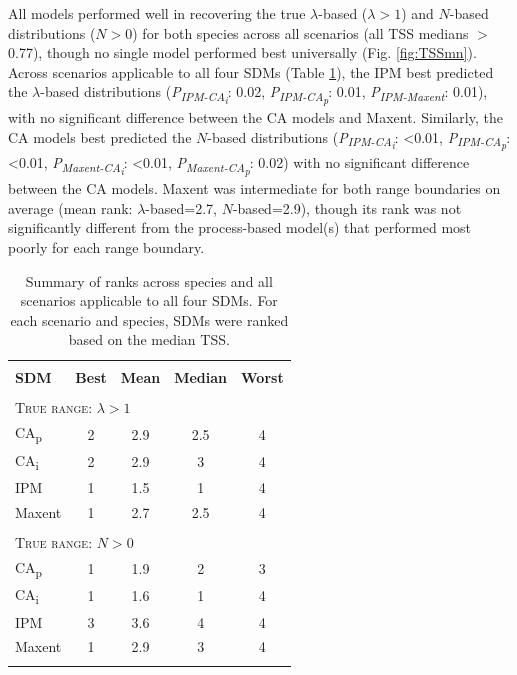 \documentclass[preprint,review,times,12pt]{elsarticle}
\begin{document}
All models performed well in recovering the true $\lambda$-based ($\lambda > 1$) and $N$-based distributions ($N>0$) for both species across all scenarios (all TSS medians $>$ 0.77), though no single model performed best universally (Fig. \ref{fig:TSSmn}). Across scenarios applicable to all four SDMs (Table \ref{table:ranks}), the IPM best predicted the $\lambda$-based distributions (\emph{P\textsubscript{IPM-CA\textsubscript{i}}}: 0.02, \emph{P\textsubscript{IPM-CA\textsubscript{p}}}: 0.01, \emph{P\textsubscript{IPM-Maxent}}: 0.01), with no significant difference between the CA models and Maxent. Similarly, the CA models best predicted the $N$-based distributions (\emph{P\textsubscript{IPM-CA\textsubscript{i}}}: \textless0.01, \emph{P\textsubscript{IPM-CA\textsubscript{p}}}: \textless0.01, \emph{P\textsubscript{Maxent-CA\textsubscript{i}}}: \textless0.01, \emph{P\textsubscript{Maxent-CA\textsubscript{p}}}: 0.02) with no significant difference between the CA models. Maxent was intermediate for both range boundaries on average (mean rank: $\lambda$-based=2.7, $N$-based=2.9), though its rank was not significantly different from the process-based model(s) that performed most poorly for each range boundary.

\begin{table}
	\centering
	\captionsetup{width=.75\textwidth}
	\begin{tabular}{l c c c c}
		\hline \\[-3.5ex]
		\textbf{SDM} & \textbf{Best} & \textbf{Mean} & \textbf{Median} & \textbf{Worst}\\
		\hline 
		\hline \\[-2.5ex]
		\multicolumn{5}{l}{\textsc{True range: $\lambda > 1$}} \\
		CA\textsubscript{p} & 2 & 2.9 & 2.5 & 4\\
		CA\textsubscript{i} & 2 & 2.9 & 3 & 4\\
		IPM & 1 & 1.5 & 1 & 4\\
		Maxent & 1 & 2.7 & 2.5 & 4\\
		[.5ex]\hline \\[-2.5ex]
		\multicolumn{5}{l}{\textsc{True range: $N > 0$}} \\
		CA\textsubscript{p} & 1 & 1.9 & 2 & 3\\
		CA\textsubscript{i} & 1 & 1.6 & 1 & 4\\
		IPM & 3 & 3.6 & 4 & 4\\
		Maxent & 1 & 2.9 & 3 & 4\\
		[.5ex]\hline \\[-2ex]
	\end{tabular}
	\caption{\label{table:ranks}Summary of ranks across species and all scenarios applicable to all four SDMs. For each scenario and species, SDMs were ranked based on the median TSS.}
\end{table}
\end{document}

